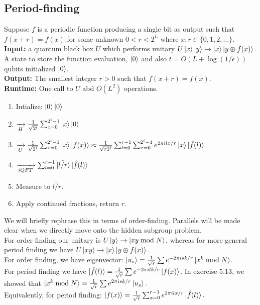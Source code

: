 \documentclass{article}
\begin{document}
\subsection{Period-finding}
Suppose $f$ is a periodic function producing a single bit as output such that $f(x+r) = f(x)$ for some unknown $0 < r < 2^L$ where $x,r \in \{0,1,2,\dots\}$.
\textbf{Input:} a quantum black box $U$ which performs unitary $U\ket{x}\ket{y} \to \ket{x} \ket{y \oplus f(x)}$. A state to store the function evaluation, $\ket{0}$ and also $t = O(L+ \log(1/\epsilon))$ qubits initialized $\ket{0}$.\\ 
\textbf{Output:} The smallest integer $r>0$ such that $f(x+r) = f(x)$.\\
\textbf{Runtime:} One call to $U$ abd $O(L^2)$ operations.
\begin{enumerate}
	\item Intialize: $\ket{0} \ket{0}$
	\item $\xrightarrow[H]{} \frac{1}{\sqrt{2^t}} \sum_{x=0}^{2^t-1}\ket{x}\ket{0}$
	\item $\xrightarrow[U]{} \frac{1}{\sqrt{2^t}} \sum_{x=0}^{2^t-1} \ket{x}\ket{f(x)} \approx \frac{1}{\sqrt{r 2^t}} \sum_{l=0}^{r-1} \sum_{x=0}^{2^t-1} e^{2\pi i lx/r} \ket{x} \ket{\hat{f}(l)}$
	\item $\xrightarrow[iQFT]{} \sum_{l=0}^{r-1} \ket{\tilde{l/r}} \ket{\hat{f}(l)}$
	\item Measure to $\tilde{l/r}$.
	\item Apply continued fractions, return $r$.
\end{enumerate}
We will briefly rephrase this in terms of order-finding. Parallels will be made clear when we directly move onto the hidden subgroup problem. \\ 
For order finding our unitary is $U\ket{y} \to \ket{xy \bmod N}$, whereas for more general period finding we have $U\ket{xy} \to \ket{x}\ket{y\oplus f(x)}$.\\
For order finding, we have eigenvector: $\ket{u_s} = \frac{1}{\sqrt{r}} \sum e^{-2\pi isk/r} \ket{x^k \bmod N}$.\\
For period finding we have $\ket{\hat{f}(l)} = \frac{1}{\sqrt{r}} \sum e^{-2\pi ilk/r} \ket{f(x)}$.
In exercise 5.13, we showed that $\ket{x^k \bmod N} = \frac{1}{\sqrt{r}} \sum e^{2\pi isk/r} \ket{u_s}.$\\
Equivalently, for period finding: $\ket{f(x)} = \frac{1}{\sqrt{r}} \sum^{r-1}_{x=0} e^{2\pi ilx/r} \ket{\hat{f}(l)}.$
\end{document}
